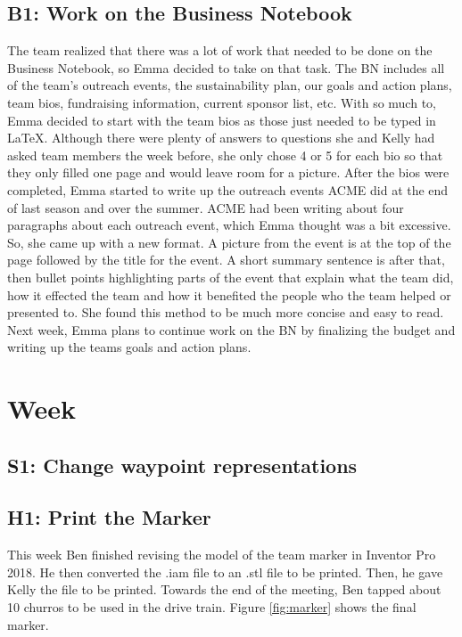 \documentclass{article}
\begin{document}
\subsection{B1: Work on the Business Notebook}

The team realized that there was a lot of work that needed to be done on the Business Notebook, so Emma decided to take on that task. The BN includes all of the team's outreach events, the sustainability plan, our goals and action plans, team bios, fundraising information, current sponsor list, etc. With so much to, Emma decided to start with the team bios as those just needed to be typed in \LaTeX . Although there were plenty of answers to questions she and Kelly had asked team members the week before, she only chose 4 or 5 for each bio so that they only filled one page and would leave room for a picture. After the bios were completed, Emma started to write up the outreach events ACME did at the end of last season and over the summer. ACME had been writing about four paragraphs about each outreach event, which Emma thought was a bit excessive. So, she came up with a new format. A picture from the event is at the top of the page followed by the title for the event. A short summary sentence is after that, then bullet points highlighting parts of the event that explain what the team did, how it effected the team and how it benefited the people who the team helped or presented to. She found this method to be much more concise and easy to read. Next week, Emma plans to continue work on the BN by finalizing the budget and writing up the teams goals and action plans. \clearpage \newpage \section{Week \thesection} 
\subsection{S1: Change waypoint representations}

\subsection{H1: Print the Marker}

This week Ben finished revising the model of the team marker in Inventor Pro 2018. He then converted the .iam file to an .stl file to be printed. Then, he gave Kelly the file to be printed. Towards the end of the meeting, Ben tapped about 10 churros to be used in the drive train. Figure \ref{fig:marker} shows the final marker. 
\end{document}
